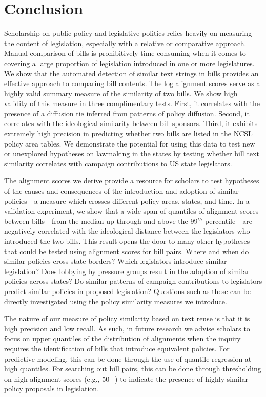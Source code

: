 \documentclass[12pt]{article} %
\begin{document}
\clearpage


\section{Conclusion}
Scholarship on public policy and legislative politics relies heavily on measuring the content of legislation, especially with a relative or comparative approach. Manual comparison of bills is prohibitively time consuming when it comes to covering a large proportion of legislation introduced in one or more legislatures. We show that the automated detection of similar text strings in bills provides an effective approach to comparing bill contents. The log alignment scores serve as a highly valid summary measure of the similarity of two bills. We show high validity of this measure in three complimentary tests. First, it correlates with the presence of a diffusion tie inferred from patterns of policy diffusion. Second, it correlates with the ideological similarity between bill sponsors. Third, it exhibits extremely high precision in predicting whether two bills are listed in the NCSL policy area tables. We demonstrate the potential for using this data to test new or unexplored hypotheses on lawmaking in the states by testing whether bill text similarity correlates with campaign contributions to US state legislators.

The alignment scores we derive provide a resource for scholars to test hypotheses of the causes and consequences of the introduction and adoption of similar policies---a measure which crosses different policy areas, states, and time. In a validation experiment, we show that a wide span of quantiles of alignment scores between bills---from the median up through and above the 99$^{th}$ percentile---are negatively correlated with the ideological distance between the legislators who introduced the two bills. This result opens the door to many other hypotheses that could be tested using alignment scores for bill pairs.  Where and when do similar policies cross state borders? Which legislators introduce similar legislation? Does lobbying by pressure groups result in the adoption of similar policies across states? Do similar patterns of campaign contributions to legislators predict similar policies in proposed legislation? Questions such as these can be directly investigated using the policy similarity measures we introduce. 

The nature of our measure of policy similarity based on text reuse is that it is high precision and low recall.  As such, in future research we advise scholars to focus on upper quantiles of the distribution of alignments when the inquiry requires the identification of bills that introduce equivalent policies. For predictive modeling, this can be done through the use of quantile regression at high quantiles. For searching out bill pairs, this can be done through thresholding on high alignment scores (e.g., 50+) to indicate the presence of highly similar policy proposals in legislation.
\end{document}

